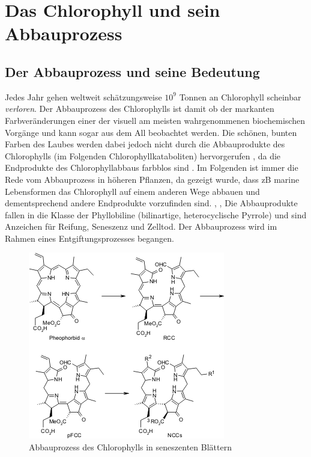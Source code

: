 \chapter{Das Chlorophyll und sein Abbauprozess}

\section{Der Abbauprozess und seine Bedeutung}

Jedes Jahr gehen weltweit schätzungsweise $10^{9}$ Tonnen an Chlorophyll scheinbar \textit{verloren}. Der Abbauprozess des Chlorophylls ist damit ob der markanten Farbveränderungen einer der visuell am meisten wahrgenommenen biochemischen Vorgänge und kann sogar aus dem All beobachtet werden. \cite{ChlorophyllBreakdown} Die schönen, bunten Farben des Laubes werden dabei jedoch nicht durch die Abbauprodukte des Chlorophylls (im Folgenden Chlorophyllkataboliten) hervorgerufen  \cite{DegradationChlorophyll}, da die Endprodukte des Chlorophyllabbaus farbblos sind \cite{ChlorophyllBreakdown}. Im Folgenden ist immer die Rede vom Abbauprozess in höheren Pflanzen, da gezeigt wurde, dass \gls{zB} marine Lebensformen das Chlorophyll auf einem anderen Wege abbauen und dementsprechend andere Endprodukte vorzufinden sind. \cite{ChlorophyllBreakdown}, \cite{ErsterKatabolit}, \cite{ChlorophyllCataboliteDifferent} Die Abbauprodukte fallen in die Klasse der Phyllobiline (bilinartige, heterocyclische Pyrrole) und sind Anzeichen für Reifung, Seneszenz und Zelltod. Der Abbauprozess wird im Rahmen eines Entgiftungsprozesses begangen. \cite{ChlorophyllKatabolitenalsZeichenReifung}

\begin{figure}[!hbtp]
  \centering
  \includegraphics[scale=0.56]{figures/Kapitel2/VWA_Schema_Chlorophyllabbau.png}
  \caption[Abbauprozess des Chlorophylls, Quelle: http://www.organische-chemie.ch/chemie/2007nov/antioxidantien.shtm (Zugegriffen am: 05.11.2017)]{Abbauprozess des Chlorophylls in seneszenten Blättern}
  \label{fig:Chlorophyllabbau}
\end{figure}

